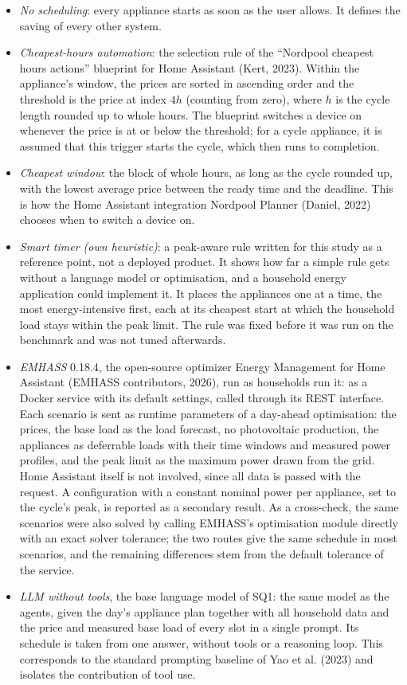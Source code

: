 \documentclass[12pt,a4paper]{report}
\begin{document}
\begin{itemize}
\item \emph{No scheduling}: every appliance starts as soon as the user
  allows. It defines the saving of every other system.
\item \emph{Cheapest-hours automation}: the selection rule of the
  ``Nordpool cheapest hours actions'' blueprint for Home Assistant (Kert,
  2023). Within the appliance's window, the
  prices are sorted in ascending order and the threshold is the price at
  index $4h$ (counting from zero), where $h$ is the cycle length rounded
  up to whole hours. The blueprint switches a device on whenever the
  price is at or below the threshold; for a cycle appliance, it is
  assumed that this trigger starts the cycle, which then runs to
  completion.
\item \emph{Cheapest window}: the block of whole hours, as long as the
  cycle rounded up, with the lowest average price between the ready time
  and the deadline. This is how the Home Assistant integration Nordpool
  Planner (Daniel, 2022) chooses when to switch a device on.
\item \emph{Smart timer (own heuristic)}: a peak-aware rule written for
  this study as a reference point, not a deployed product. It shows how
  far a simple rule gets without a language model or optimisation, and a
  household energy application could implement it. It places the
  appliances one at a time, the most energy-intensive first, each at its
  cheapest start at which the household load stays within the peak
  limit. The rule was fixed before it was run on the benchmark and was
  not tuned afterwards.
\item \emph{EMHASS} 0.18.4, the open-source optimizer Energy Management
  for Home Assistant (EMHASS contributors, 2026), run as households run
  it: as a Docker service with its default settings, called through its
  REST interface.
  Each scenario is sent as runtime parameters of a day-ahead
  optimisation: the prices, the base load as the load forecast, no
  photovoltaic production, the appliances as deferrable loads with their
  time windows and measured power profiles, and the peak limit as the
  maximum power drawn from the grid. Home Assistant itself is not
  involved, since all data is passed with the request. A configuration
  with a constant nominal power per appliance, set to the cycle's peak,
  is reported as a secondary result. As a cross-check, the same
  scenarios were also solved by calling EMHASS's optimisation module
  directly with an exact solver tolerance; the two routes give the same
  schedule in most scenarios, and the remaining differences stem from the
  default tolerance of the service.
\item \emph{LLM without tools}, the base language model of SQ1: the same model as the agents, given the
  day's appliance plan together with all household data and the price and
  measured base load of every slot in a single prompt. Its schedule is
  taken from one answer, without tools or a reasoning loop. This
  corresponds to the standard prompting baseline of Yao et al. (2023) and
  isolates the contribution of tool use.
\end{itemize}
\end{document}
